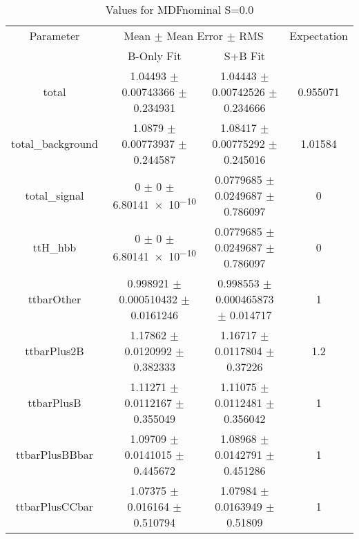 \begin{table}
\centering
\caption{Values for MDFnominal S=0.0}
\begin{tabular}{cccc}
\toprule
Parameter & \multicolumn{2}{c}{Mean $\pm$ Mean Error $\pm$ RMS} & Expectation\\
 & B-Only Fit & S+B Fit & \\
\midrule
total & \num{1.04493} $\pm$ \num{0.00743366} $\pm$ \num{0.234931} & \num{1.04443} $\pm$ \num{0.00742526} $\pm$ \num{0.234666} & \num{0.955071}\\
total\_background & \num{1.0879} $\pm$ \num{0.00773937} $\pm$ \num{0.244587} & \num{1.08417} $\pm$ \num{0.00775292} $\pm$ \num{0.245016} & \num{1.01584}\\
total\_signal & \num{0} $\pm$ \num{0} $\pm$ \num{6.80141e-10} & \num{0.0779685} $\pm$ \num{0.0249687} $\pm$ \num{0.786097} & \num{0}\\
ttH\_hbb & \num{0} $\pm$ \num{0} $\pm$ \num{6.80141e-10} & \num{0.0779685} $\pm$ \num{0.0249687} $\pm$ \num{0.786097} & \num{0}\\
ttbarOther & \num{0.998921} $\pm$ \num{0.000510432} $\pm$ \num{0.0161246} & \num{0.998553} $\pm$ \num{0.000465873} $\pm$ \num{0.014717} & \num{1}\\
ttbarPlus2B & \num{1.17862} $\pm$ \num{0.0120992} $\pm$ \num{0.382333} & \num{1.16717} $\pm$ \num{0.0117804} $\pm$ \num{0.37226} & \num{1.2}\\
ttbarPlusB & \num{1.11271} $\pm$ \num{0.0112167} $\pm$ \num{0.355049} & \num{1.11075} $\pm$ \num{0.0112481} $\pm$ \num{0.356042} & \num{1}\\
ttbarPlusBBbar & \num{1.09709} $\pm$ \num{0.0141015} $\pm$ \num{0.445672} & \num{1.08968} $\pm$ \num{0.0142791} $\pm$ \num{0.451286} & \num{1}\\
ttbarPlusCCbar & \num{1.07375} $\pm$ \num{0.016164} $\pm$ \num{0.510794} & \num{1.07984} $\pm$ \num{0.0163949} $\pm$ \num{0.51809} & \num{1}\\
\bottomrule
\end{tabular}
\end{table}